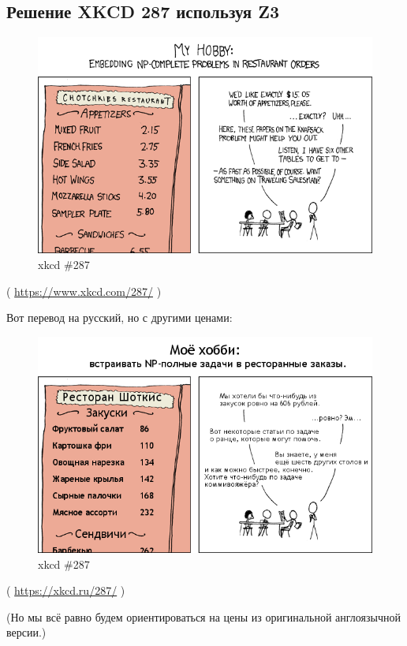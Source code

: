 \subsection{Решение XKCD 287 используя Z3}

\begin{figure}[H]
\centering
\includegraphics[scale=7]{SMT/xkcd287/np_complete.png}
\caption{xkcd \#287}
\end{figure}

( \url{https://www.xkcd.com/287/} )

Вот перевод на русский, но с другими ценами:

\begin{figure}[H]
\centering
\includegraphics[scale=7]{SMT/xkcd287/287_v1.png}
\caption{xkcd \#287}
\end{figure}

( \url{https://xkcd.ru/287/} )

(Но мы всё равно будем ориентироваться на цены из оригинальной англоязычной версии.)

